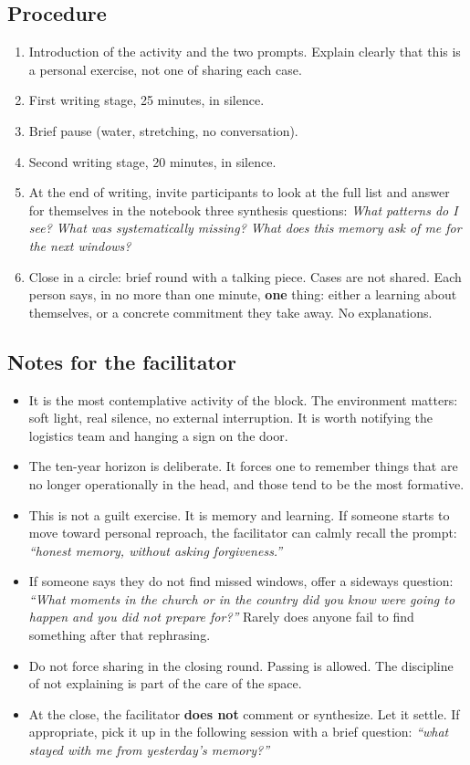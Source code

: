 \documentclass[11pt, a4paper]{article}
\begin{document}
\begin{actividad}
\subsection*{Procedure}
\begin{enumerate}[label={\arabic*.}]
  \item Introduction of the activity and the two prompts. Explain clearly that this is a personal exercise, not one of sharing each case.
  \item First writing stage, 25 minutes, in silence.
  \item Brief pause (water, stretching, no conversation).
  \item Second writing stage, 20 minutes, in silence.
  \item At the end of writing, invite participants to look at the full list and answer for themselves in the notebook three synthesis questions: \emph{What patterns do I see? What was systematically missing? What does this memory ask of me for the next windows?}
  \item Close in a circle: brief round with a talking piece. Cases are not shared. Each person says, in no more than one minute, \textbf{one} thing: either a learning about themselves, or a concrete commitment they take away. No explanations.
\end{enumerate}

\subsection*{Notes for the facilitator}
\begin{itemize}
  \item It is the most contemplative activity of the block. The environment matters: soft light, real silence, no external interruption. It is worth notifying the logistics team and hanging a sign on the door.
  \item The ten-year horizon is deliberate. It forces one to remember things that are no longer operationally in the head, and those tend to be the most formative.
  \item This is not a guilt exercise. It is memory and learning. If someone starts to move toward personal reproach, the facilitator can calmly recall the prompt: \emph{``honest memory, without asking forgiveness.''}
  \item If someone says they do not find missed windows, offer a sideways question: \emph{``What moments in the church or in the country did you know were going to happen and you did not prepare for?''} Rarely does anyone fail to find something after that rephrasing.
  \item Do not force sharing in the closing round. Passing is allowed. The discipline of not explaining is part of the care of the space.
  \item At the close, the facilitator \textbf{does not} comment or synthesize. Let it settle. If appropriate, pick it up in the following session with a brief question: \emph{``what stayed with me from yesterday's memory?''}
\end{itemize}

\end{actividad}
\end{document}
